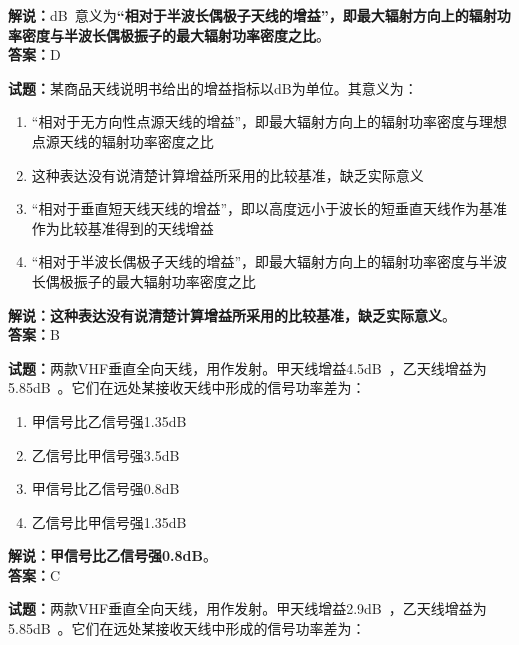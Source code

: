 \documentclass{ctexbook}
\begin{document}
\noindent\textbf{解说：}\unit[qualifier-mode=combine]{\deci\bel{}}意义为\textbf{“相对于半波长偶极子天线的增益”，即最大辐射方向上的辐射功率密度与半波长偶极振子的最大辐射功率密度之比}。\\\noindent\textbf{答案：}D


\bigskip


\noindent\textbf{试题：}某商品天线说明书给出的增益指标以\si{\dB}为单位。其意义为：

\begin{enumerate}[leftmargin=3em]
	\item “相对于无方向性点源天线的增益”，即最大辐射方向上的辐射功率密度与理想点源天线的辐射功率密度之比
	\item 这种表达没有说清楚计算增益所采用的比较基准，缺乏实际意义
	\item “相对于垂直短天线天线的增益”，即以高度远小于波长的短垂直天线作为基准作为比较基准得到的天线增益
	\item “相对于半波长偶极子天线的增益”，即最大辐射方向上的辐射功率密度与半波长偶极振子的最大辐射功率密度之比
\end{enumerate}

\noindent\textbf{解说：这种表达没有说清楚计算增益所采用的比较基准，缺乏实际意义}。\\\noindent\textbf{答案：}B


\bigskip


\noindent\textbf{试题：}两款VHF垂直全向天线，用作发射。甲天线增益4.5\unit[qualifier-mode=combine]{\deci\bel{}}，乙天线增益为5.85\unit[qualifier-mode=combine]{\deci\bel{}}。它们在远处某接收天线中形成的信号功率差为：

\begin{enumerate}[leftmargin=3em]
	\item 甲信号比乙信号强1.35\si{\dB}
	\item 乙信号比甲信号强3.5\si{\dB}
	\item 甲信号比乙信号强0.8\si{\dB}
	\item 乙信号比甲信号强1.35\si{\dB}
\end{enumerate}

\noindent\textbf{解说：甲信号比乙信号强0.8\si{\dB}}。\\\noindent\textbf{答案：}C


\bigskip


\noindent\textbf{试题：}两款VHF垂直全向天线，用作发射。甲天线增益2.9\unit[qualifier-mode=combine]{\deci\bel{}}，乙天线增益为5.85\unit[qualifier-mode=combine]{\deci\bel{}}。它们在远处某接收天线中形成的信号功率差为：
\end{document}
